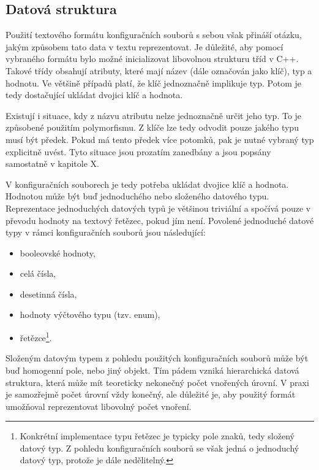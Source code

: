 \documentclass[FM,bw,DP]{tulthesis}
\begin{document}
\subsection{Datová struktura}
\label{sec:datova-sturktura}
Použití textového formátu konfiguračních souborů s sebou však přináší otázku, jakým způsobem tato data v textu reprezentovat. Je důležité, aby pomocí vybraného formátu bylo možné inicializovat libovolnou strukturu tříd v C++. Takové třídy obsahují atributy, které mají název (dále označován jako klíč), typ a hodnotu. Ve většině případů platí, že klíč jednoznačně implikuje typ. Potom je tedy dostačující ukládat dvojici klíč a hodnota.

Existují i situace, kdy z názvu atributu nelze jednoznačně určit jeho typ. To je způsobené použitím polymorfismu. Z klíče lze tedy odvodit pouze jakého typu musí být předek. Pokud má tento předek více potomků, pak je nutné vybraný typ explicitně uvést. Tyto situace jsou prozatím zanedbány a jsou popsány samostatně v kapitole X.

V konfiguračních souborech je tedy potřeba ukládat dvojice klíč a hodnota. Hodnotou může být buď jednoduchého nebo složeného datového typu. Reprezentace jednoduchých datových typů je většinou triviální a spočívá pouze v převodu hodnoty na textový řetězec, pokud jím není. Povolené jednoduché datové typy v rámci konfiguračních souborů jsou následující:

\begin{itemize}
	\item booleovské hodnoty, %
	\item celá čísla,
	\item desetinná čísla,
	\item hodnoty výčtového typu (tzv. enum),
	\item řetězce\footnote{Konkrétní implementace typu řetězec je typicky pole znaků, tedy složený datový typ. Z pohledu konfiguračních souborů se však jedná o jednoduchý datový typ, protože je dále nedělitelný.}.
\end{itemize}

Složeným datovým typem z pohledu použitých konfiguračních souborů může být buď homogenní pole, nebo jiný objekt. Tím pádem vzniká hierarchická datová struktura, která může mít teoreticky nekonečný počet vnořených úrovní. V praxi je samozřejmě počet úrovní vždy konečný, ale důležité je, aby použitý formát umožňoval reprezentovat libovolný počet vnoření.
\end{document}
